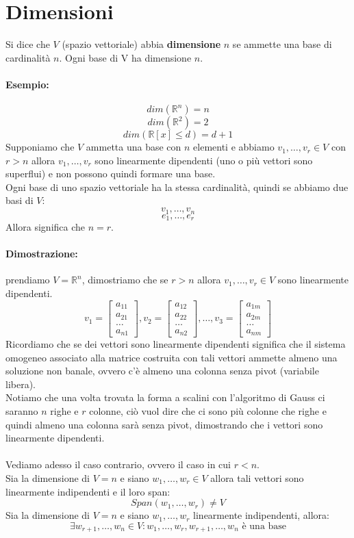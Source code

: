 \documentclass[12pt,a4paper]{article}
\let\oldsection\section
\renewcommand{\section}{\clearpage\oldsection}
\begin{document}
\section{Dimensioni}
Si dice che $V$ (spazio vettoriale) abbia \textbf{dimensione} $n$ se ammette una base di cardinalità $n$. Ogni base di V ha dimensione $n$.
\paragraph{Esempio:}
\[
dim(\mathbb{R}^n) = n
\]
\[
dim(\mathbb{R}^2) = 2
\]
\[
dim(\mathbb{R}[x] \leq d) = d + 1
\]
Supponiamo che $V$ ammetta una base con $n$ elementi e abbiamo $v_1,\ldots,v_r \in V$ con $r > n$ allora $v_1,\ldots,v_r$ sono linearmente dipendenti (uno o più vettori sono superflui) e non possono quindi formare una base.\\
Ogni base di uno spazio vettoriale ha la stessa cardinalità, quindi se abbiamo due basi di $V$:
\[
v_1,\ldots,v_n
\]
\[
e_1,\ldots,e_r
\]
Allora significa che $n = r$.
\paragraph{Dimostrazione:} prendiamo $V = \mathbb{R}^n$, dimostriamo che se $r > n$ allora $v_1,\ldots,v_r \in V$ sono linearmente dipendenti.
\[
v_1 = \begin{bmatrix}
  a_{11}\\
  a_{21}\\
  \ldots\\
  a_{n1}
\end{bmatrix}, v_2 = \begin{bmatrix}
  a_{12}\\
  a_{22}\\
  \ldots\\
  a_{n2}
\end{bmatrix}, \ldots, v_3 = \begin{bmatrix}
  a_{1m}\\
  a_{2m}\\
  \ldots\\
  a_{nm}
\end{bmatrix}
\]
Ricordiamo che se dei vettori sono linearmente dipendenti significa che il sistema omogeneo associato alla matrice costruita con tali vettori ammette almeno una soluzione non banale, ovvero c'è almeno una colonna senza pivot (variabile libera).\\
Notiamo che una volta trovata la forma a scalini con l'algoritmo di Gauss ci saranno $n$ righe e $r$ colonne, ciò vuol dire che ci sono più colonne che righe e quindi almeno una colonna sarà senza pivot, dimostrando che i vettori sono linearmente dipendenti.\\\\
Vediamo adesso il caso contrario, ovvero il caso in cui $r < n$.\\
Sia la dimensione di $V = n$ e siano $w_1,\ldots,w_r \in V$ allora tali vettori sono linearmente indipendenti e il loro span:
\[
Span(w_1,\ldots,w_r) \ne V
\]
Sia la dimensione di $V = n$ e siano $w_1,\ldots,w_r$ linearmente indipendenti, allora:
\[
\exists w_{r+1},\ldots,w_n \in V : w_1,\ldots,w_r,w_{r+1},\ldots,w_n \text{ è una base}
\]
\end{document}
